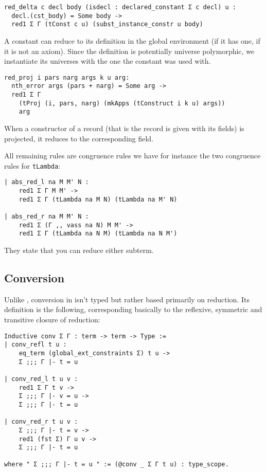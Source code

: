 \begin{verbatim}
red_delta c decl body (isdecl : declared_constant Σ c decl) u :
  decl.(cst_body) = Some body ->
  red1 Σ Γ (tConst c u) (subst_instance_constr u body)
\end{verbatim}
A constant can reduce to its definition in the global environment (if it has
one, \ie if it is not an axiom). Since the definition is potentially universe
polymorphic, we instantiate its universes with the one the constant was used
with.

\begin{verbatim}
red_proj i pars narg args k u arg:
  nth_error args (pars + narg) = Some arg ->
  red1 Σ Γ
    (tProj (i, pars, narg) (mkApps (tConstruct i k u) args))
    arg
\end{verbatim}
When a constructor of a record (that is the record is given with its fields) is
projected, it reduces to the corresponding field.

All remaining rules are congruence rules we have for instance the two congruence
rules for \texttt{tLambda}:
\begin{verbatim}
| abs_red_l na M M' N :
    red1 Σ Γ M M' ->
    red1 Σ Γ (tLambda na M N) (tLambda na M' N)

| abs_red_r na M M' N :
    red1 Σ (Γ ,, vass na N) M M' ->
    red1 Σ Γ (tLambda na N M) (tLambda na N M')
\end{verbatim}
They state that you can reduce either subterm.

\subsection{Conversion}

Unlike \Agda, conversion in \Coq isn't typed but rather based primarily on
reduction. Its definition is the following, corresponding basically to the
reflexive, symmetric and transitive closure of reduction:
\begin{verbatim}
Inductive conv Σ Γ : term -> term -> Type :=
| conv_refl t u :
    eq_term (global_ext_constraints Σ) t u ->
    Σ ;;; Γ |- t = u

| conv_red_l t u v :
    red1 Σ Γ t v ->
    Σ ;;; Γ |- v = u ->
    Σ ;;; Γ |- t = u

| conv_red_r t u v :
    Σ ;;; Γ |- t = v ->
    red1 (fst Σ) Γ u v ->
    Σ ;;; Γ |- t = u

where " Σ ;;; Γ |- t = u " := (@conv _ Σ Γ t u) : type_scope.
\end{verbatim}

